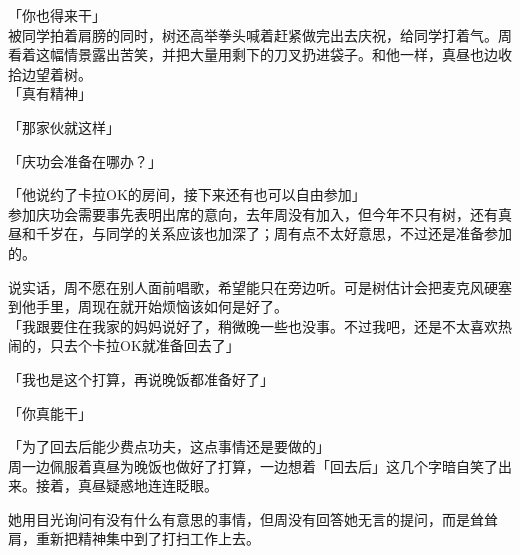 「你也得来干」\\

被同学拍着肩膀的同时，树还高举拳头喊着赶紧做完出去庆祝，给同学打着气。周看着这幅情景露出苦笑，并把大量用剩下的刀叉扔进袋子。和他一样，真昼也边收拾边望着树。\\

「真有精神」

「那家伙就这样」

「庆功会准备在哪办？」

「他说约了卡拉OK的房间，接下来还有也可以自由参加」\\

参加庆功会需要事先表明出席的意向，去年周没有加入，但今年不只有树，还有真昼和千岁在，与同学的关系应该也加深了；周有点不太好意思，不过还是准备参加的。

说实话，周不愿在别人面前唱歌，希望能只在旁边听。可是树估计会把麦克风硬塞到他手里，周现在就开始烦恼该如何是好了。\\

「我跟要住在我家的妈妈说好了，稍微晚一些也没事。不过我吧，还是不太喜欢热闹的，只去个卡拉OK就准备回去了」

「我也是这个打算，再说晚饭都准备好了」

「你真能干」

「为了回去后能少费点功夫，这点事情还是要做的」\\

周一边佩服着真昼为晚饭也做好了打算，一边想着「回去后」这几个字暗自笑了出来。接着，真昼疑惑地连连眨眼。

她用目光询问有没有什么有意思的事情，但周没有回答她无言的提问，而是耸耸肩，重新把精神集中到了打扫工作上去。
